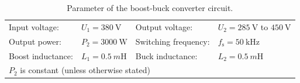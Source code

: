 
\begin{table}[ht]
	\centering  %
	\begin{tabular}{llll}
		\toprule

		Input voltage: & $U_{\mathrm{1}} = \SI{380}{\volt}$  & Output voltage:      & $U_{\mathrm{2}} = \SI{285}{\volt}$  to $\SI{450}{\volt}$ \\
		Output power:  & $P_{\mathrm{2}} = \SI{3000}{\watt}$ & Switching frequency: & $f_{\mathrm{s}} = \SI{50}{\kilo\hertz}$                  \\
		Boost inductance: & $L_1= \SI{0.5}{m\henry}$ & Buck inductance: & $L_2= \SI{0.5}{m\henry}$ \\
		\multicolumn{4}{l}{$P_{\mathrm{2}}$ is constant (unless otherwise stated)}                                                             \\
		\bottomrule
	\end{tabular}
	\caption{Parameter of the  boost-buck converter circuit.}  %
	\label{table:ParametersOfBoostBuckConverter}
\end{table}